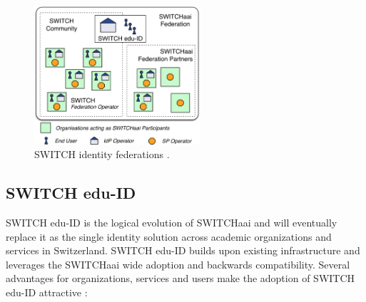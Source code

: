 \begin{figure}[ht!]
	\centering
	\captionsetup{width=.7\linewidth}
	\includegraphics[width=0.55\textwidth]{figs/ch3/switch-federation}
	\caption{SWITCH identity federations \cite{eduid-service-description}.}
	\label{fig:switch-federation}
\end{figure}

\subsection{SWITCH edu-ID} \label{ssec:switch-eduid}

SWITCH edu-ID is the logical evolution of SWITCHaai and will eventually replace it as the single identity solution across academic organizations and services in Switzerland. SWITCH edu-ID builds upon existing infrastructure and leverages the SWITCHaai wide adoption and backwards compatibility. Several advantages for organizations, services and users make the adoption of SWITCH edu-ID attractive \cite{switch-eduid-benefits}: 

